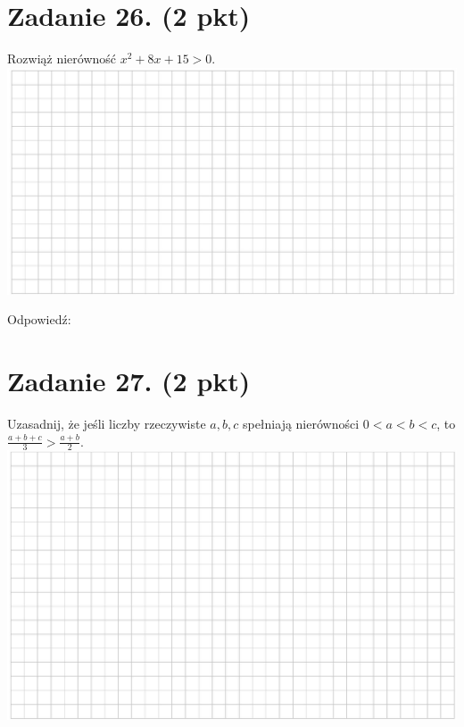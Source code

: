 \documentclass[10pt]{article}
\begin{document}
\section*{Zadanie 26. (2 pkt)}
Rozwiąż nierówność \(x^{2}+8 x+15>0\).\\
\includegraphics[max width=\textwidth, center]{2024_11_21_dcf819de2d2eef051a0dg-10}

Odpowiedź:

\section*{Zadanie 27. (2 pkt)}
Uzasadnij, że jeśli liczby rzeczywiste \(a, b, c\) spełniają nierówności \(0<a<b<c\), to \(\frac{a+b+c}{3}>\frac{a+b}{2}\).\\
\includegraphics[max width=\textwidth, center]{2024_11_21_dcf819de2d2eef051a0dg-10(1)}
\end{document}

